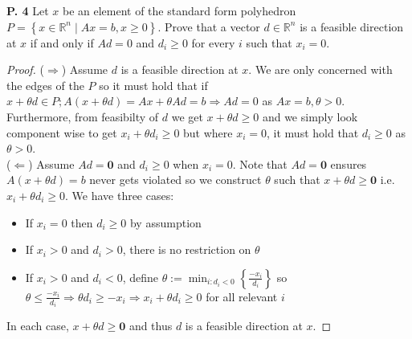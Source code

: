 \documentclass{article}
\begin{document}
\begin{jacklist}
\newpage
    \begin{framed} 
    \item [\textbf{P. 4}] Let $x$ be an element of the standard form polyhedron 
        $P=\left\{x \in \mathbb{R}^{n} \mid A x=b, x \geq 0\right\}$. Prove that a vector $d \in \mathbb{R}^{n}$ is a feasible 
        direction at $x$ if and only if $A d=0$ and $d_{i} \geq 0$ for every $i$ such that $x_{i}=0$.
    \end{framed}
    \begin{proof}
        ($\Rightarrow$) Assume $d$ is a feasible direction at $x$. We are only concerned with the edges of the $P$ so it must hold that if 
        $x + \theta d \in P; A(x+\theta d) = Ax + \theta Ad = b \Rightarrow Ad = 0$ as $Ax = b, \theta > 0$. Furthermore, 
        from feasibilty of $d$ we get $x + \theta d \geq 0$ and we simply look component wise to get $x_i + \theta d_i \geq 0$ but where
        $x_i = 0$, it must hold that $d_i \geq 0$ as $\theta > 0$. \\
        ($\Leftarrow$) Assume $Ad = \textbf{0}$ and $d_i \geq 0$ when $x_i = 0$. Note that $Ad = \textbf{0}$ 
        ensures $A(x + \theta d) = b$ never gets violated so we construct $\theta$ such that 
        $x + \theta d \geq \textbf{0}$ i.e. $x_i + \theta d_i \geq 0$. We have three cases:
        \begin{itemize}
            \item If $x_i = 0$ then $d_i \geq 0$ by assumption 
            \item If $x_i > 0$ and $d_i > 0$, there is no restriction on $\theta$ 
            \item If $x_i > 0$ and $d_i < 0$, define $ \displaystyle \theta := \min_{i:d_i<0}\left\{ \frac{-x_i}{d_i}\right\}$ so
                $ \displaystyle \theta \leq \frac{-x_i}{d_i} \Rightarrow \theta d_i \geq -x_i \Rightarrow x_i + \theta d_i \geq 0$ 
                for all relevant $i$
        \end{itemize}
        In each case, $x + \theta d \geq \textbf{0}$ and thus $d$ is a feasible direction at $x$. 
    \end{proof}


\end{jacklist}
\end{document}
